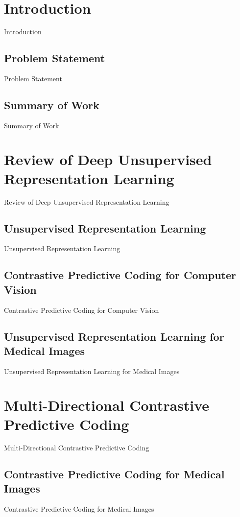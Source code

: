 \section{Introduction}
Introduction

\subsection{Problem Statement}
Problem Statement

\subsection{Summary of Work}
Summary of Work



\section{Review of Deep Unsupervised Representation Learning}
Review of Deep Unsupervised Representation Learning

\subsection{Unsupervised Representation Learning}
Unsupervised Representation Learning

\subsection{Contrastive Predictive Coding for Computer Vision}
Contrastive Predictive Coding for Computer Vision

\subsection{Unsupervised Representation Learning for Medical Images}
Unsupervised Representation Learning for Medical Images



\section{Multi-Directional Contrastive Predictive Coding}
Multi-Directional Contrastive Predictive Coding

\subsection{Contrastive Predictive Coding for Medical Images}
Contrastive Predictive Coding for Medical Images

